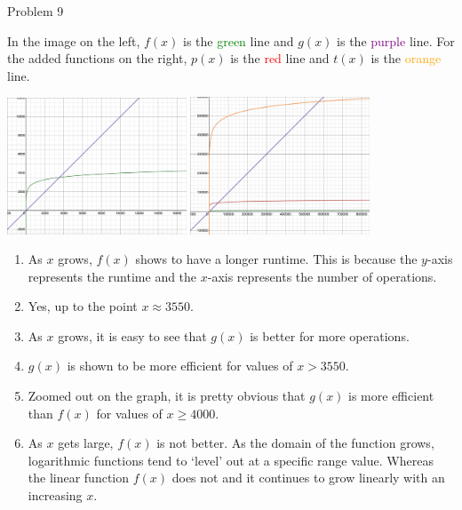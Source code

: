 \begin{problem}{Problem 9}
    \begin{Highlight}[Solution]
        In the image on the left, $f(x)$ is the \textcolor{green}{green} line and $g(x)$ is the \textcolor{purple}{purple} line. For the added functions on the right, $p(x)$ is the \textcolor{red}{red} 
        line and $t(x)$ is the \textcolor{orange}{orange} line.
        \begin{center}
            \includegraphics[width = 0.4\textwidth]{./Images/Desmos 1.png}
            \hspace{20pt}
            \includegraphics[width = 0.4\textwidth]{./Images/Desmos 2.png}
        \end{center}
        
        \begin{enumerate}[label=(\alph*)]
            \item As $x$ grows, $f(x)$ shows to have a longer runtime. This is because the $y$-axis represents the runtime and the $x$-axis represents the number of operations.
            \item Yes, up to the point $x \approx 3550$.
            \item As $x$ grows, it is easy to see that $g(x)$ is better for more operations.
            \item $g(x)$ is shown to be more efficient for values of $x > 3550$.
            \item Zoomed out on the graph, it is pretty obvious that $g(x)$ is more efficient than $f(x)$ for values of $x \geq 4000$.
            \item As $x$ gets large, $f(x)$ is not better. As the domain of the function grows, logarithmic functions tend to `level' out at a specific range value. Whereas the linear function $f(x)$ does not
            and it continues to grow linearly with an increasing $x$.
        \end{enumerate}
    \end{Highlight}
\end{problem}


